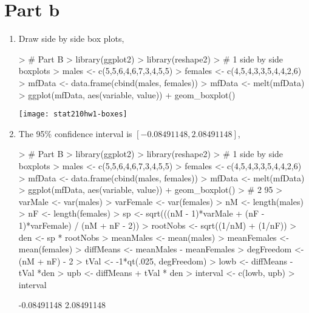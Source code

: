 \documentclass{article}
\begin{document}
\section*{Part b}
\begin{enumerate}
  \item Draw side by side box plots, 
  
\begin{Schunk}
\begin{Sinput}
> # Part B
> library(ggplot2)
> library(reshape2)
>   # 1 side by side boxplots
> males <- c(5,5,6,4,6,7,3,4,5,5)
> females <- c(4,5,4,3,3,5,4,4,2,6)
> mfData <- data.frame(cbind(males, females))
> mfData <- melt(mfData)
> ggplot(mfData, aes(variable, value)) + geom_boxplot()
\end{Sinput}
\end{Schunk}
\texttt{[image: stat210hw1-boxes]}

\item The 95\% confidence interval is $[-0.08491148,  2.08491148]$, 
\begin{Schunk}
\begin{Sinput}
> # Part B
> library(ggplot2)
> library(reshape2)
>   # 1 side by side boxplots
> males <- c(5,5,6,4,6,7,3,4,5,5)
> females <- c(4,5,4,3,3,5,4,4,2,6)
> mfData <- data.frame(cbind(males, females))
> mfData <- melt(mfData)
> ggplot(mfData, aes(variable, value)) + geom_boxplot()
>   # 2 95% CI
> varMale <- var(males)
> varFemale <- var(females)
> nM <- length(males)
> nF <- length(females)
> sp <- sqrt(((nM - 1)*varMale + (nF - 1)*varFemale) / (nM + nF - 2))
> rootNobs <- sqrt((1/nM) + (1/nF))
> den <- sp * rootNobs
> meanMales <- mean(males)
> meanFemales <- mean(females)
> diffMeans <- meanMales - meanFemales
> degFreedom <- (nM + nF) - 2
> tVal <- -1*qt(.025, degFreedom)
> lowb <- diffMeans - tVal *den
> upb <- diffMeans + tVal * den
> interval <- c(lowb, upb)
> interval
\end{Sinput}
\begin{Soutput}
[1] -0.08491148  2.08491148
\end{Soutput}
\end{Schunk}


\end{enumerate}
\end{document}
